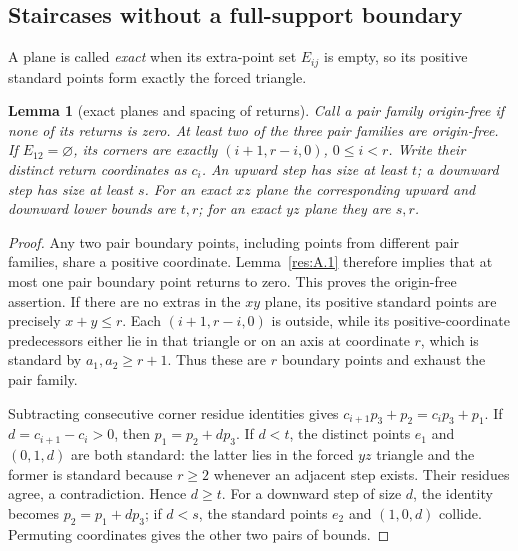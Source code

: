 \documentclass[11pt]{article}
\newtheorem{lemma}[theorem]{Lemma}
\theoremstyle{definition}
\theoremstyle{remark}
\theoremstyle{plain}
\begin{document}
\subsection{Staircases without a full-support boundary}
A plane is called \emph{exact} when its extra-point set $E_{ij}$ is empty,
so its positive standard points form exactly the forced triangle.
\begin{lemma}[exact planes and spacing of returns]\label{res:A.20} Call a pair family origin-free if none of its returns is zero. At least two of the three pair families are origin-free. If \(E_{12}=\varnothing\), its corners are exactly \((i+1,r-i,0)\), \(0\le i<r\). Write their distinct return coordinates as \(c_i\). An upward step has size at least \(t\); a downward step has size at least \(s\). For an exact \(xz\) plane the corresponding upward and downward lower bounds are \(t,r\); for an exact \(yz\) plane they are \(s,r\).
\end{lemma}
\begin{proof} Any two pair boundary points, including points from different pair families, share a positive coordinate. Lemma~\ref{res:A.1} therefore implies that at most one pair boundary point returns to zero. This proves the origin-free assertion. If there are no extras in the \(xy\) plane, its positive standard points are precisely \(x+y\le r\). Each \((i+1,r-i,0)\) is outside, while its positive-coordinate predecessors either lie in that triangle or on an axis at coordinate \(r\), which is standard by \(a_1,a_2\ge r+1\). Thus these are \(r\) boundary points and exhaust the pair family.

Subtracting consecutive corner residue identities gives
\(c_{i+1}p_3+p_2=c_ip_3+p_1\).
If \(d=c_{i+1}-c_i>0\), then \(p_1=p_2+dp_3\). If \(d<t\), the distinct points \(e_1\) and \((0,1,d)\) are both standard: the latter lies in the forced \(yz\) triangle and the former is standard because \(r\ge2\) whenever an adjacent step exists. Their residues agree, a contradiction. Hence \(d\ge t\). For a downward step of size \(d\), the identity becomes \(p_2=p_1+dp_3\); if \(d<s\), the standard points \(e_2\) and \((1,0,d)\) collide. Permuting coordinates gives the other two pairs of bounds. \end{proof}
\end{document}
